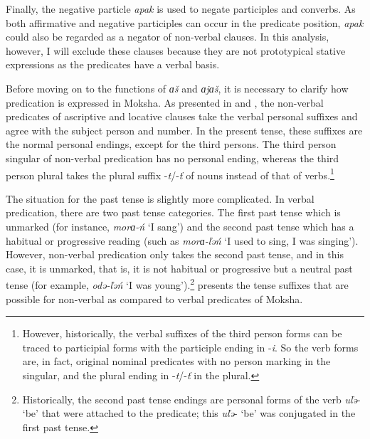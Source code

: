 \documentclass[output=paper,colorlinks,citecolor=brown,draft,draftmode]{langscibook}
\begin{document}
  Finally, the negative particle \textit{apak} is used to negate participles and converbs. As both affirmative and negative participles can occur in the predicate position, \textit{apak} could also be regarded as a negator of non-verbal clauses. In this analysis, however, I will exclude these clauses because they are not prototypical stative expressions as the predicates have a verbal basis.

  Before moving on to the functions of \textit{ɑš} and \textit{ɑjɑš}, it is necessary to clarify how predication is expressed in Moksha. As presented in  and , the non-verbal predicates of ascriptive and locative clauses take the verbal personal suffixes and agree with the subject person and number. In the present tense, these suffixes are the normal personal endings, except for the third persons. The third person singular of non-verbal predication has no personal ending, whereas the third person plural takes the plural suffix -\textit{t}/-\textit{ť} of nouns instead of that of verbs.\footnote{However, historically, the verbal suffixes of the third person forms can be traced to participial forms with the participle ending in -\textit{i}. So the verb forms are, in fact, original nominal predicates with no person marking in the singular, and the plural ending in -\textit{t}/-\textit{ť} in the plural.}

  The situation for the past tense is slightly more complicated. In verbal predication, there are two past tense categories. The first past tense which is unmarked (for instance, \textit{morɑ-ń} `I sang') and the second past tense which has a habitual or progressive reading (such as \textit{morɑ-ľəń} `I used to sing, I was singing'). However, non-verbal predication only takes the second past tense, and in this case, it is unmarked, that is, it is not habitual or progressive but a neutral past tense (for example, \textit{odə-ľəń} `I was young').\footnote{Historically, the second past tense endings are personal forms of the verb \textit{uľə}- `be' that were attached to the predicate; this \textit{uľə}- `be' was conjugated in the first past tense.}  presents the tense suffixes that are possible for non-verbal as compared to verbal predicates of Moksha.
\end{document}
